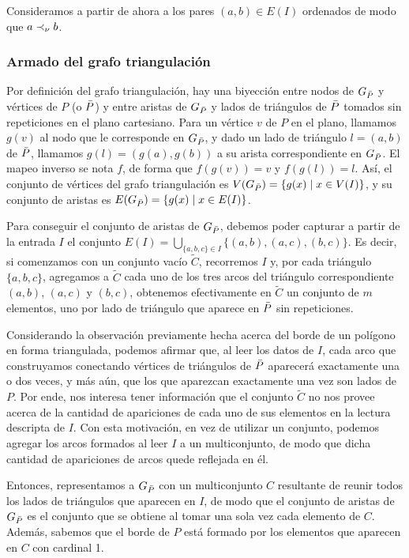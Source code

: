 \medskip

Consideramos a partir de ahora a los pares $(a,b) \in E(I)$ ordenados de modo que $a \prec_{\nu} b$.

\subsubsection{Armado del grafo triangulación}

Por definición del grafo triangulación, hay una biyección entre nodos de $G_{\bar{P}}$ y vértices de $P$ (o $\bar{P}$) y entre aristas de $G_{\bar{P}}$ y lados de triángulos de $\bar{P}$ tomados sin repeticiones en el plano cartesiano. Para un vértice $v$ de $P$ en el plano, llamamos $g(v)$ al nodo que le corresponde en $G_{\bar{P}}$, y dado un lado de triángulo $l = (a,b)$ de $\bar{P}$, llamamos $g(l) = (g(a),g(b))$ a su arista correspondiente en $G_{\bar{P}}$. El mapeo inverso se nota $f$, de forma que $f(g(v)) = v$ y $f(g(l)) = l$. Así, el conjunto de vértices del grafo triangulación es $V(G_{\bar{P}}) = \{ g(x) \mid x \in V(I) \}$, y su conjunto de aristas es $E(G_{\bar{P}}) = \{ g(x) \mid x \in E(I) \}$.

Para conseguir el conjunto de aristas de $G_{\bar{P}}$, debemos poder capturar a partir de la entrada $I$ el conjunto $E(I) = \bigcup_{\{ a,b,c \} \in I} \{ (a,b), (a,c), (b,c) \}$. Es decir, si comenzamos con un conjunto vacío $\widetilde{C}$, recorremos $I$ y, por cada triángulo $\{ a,b,c \}$, agregamos a $\widetilde{C}$ cada uno de los tres arcos del triángulo correspondiente $(a,b)$, $(a,c)$ y $(b,c)$, obtenemos efectivamente en $\widetilde{C}$ un conjunto de $m$ elementos, uno por lado de triángulo que aparece en $\bar{P}$ sin repeticiones. 

Considerando la observación previamente hecha acerca del borde de un polígono en forma triangulada, podemos afirmar que, al leer los datos de $I$, cada arco que construyamos conectando vértices de triángulos de $\bar{P}$ aparecerá exactamente una o dos veces, y más aún, que los que aparezcan exactamente una vez son lados de $P$. Por ende, nos interesa tener información que el conjunto $\widetilde{C}$ no nos provee acerca de la cantidad de apariciones de cada uno de sus elementos en la lectura descripta de $I$. Con esta motivación, en vez de utilizar un conjunto, podemos agregar los arcos formados al leer $I$ a un multiconjunto, de modo que dicha cantidad de apariciones de arcos quede reflejada en él.

Entonces, representamos a $G_{\bar{P}}$ con un multiconjunto $C$ resultante de reunir todos los lados de triángulos que aparecen en $I$, de modo que el conjunto de aristas de $G_{\bar{P}}$ es el conjunto que se obtiene al tomar una sola vez cada elemento de $C$. Además, sabemos que el borde de $P$ está formado por los elementos que aparecen en $C$ con cardinal 1.

